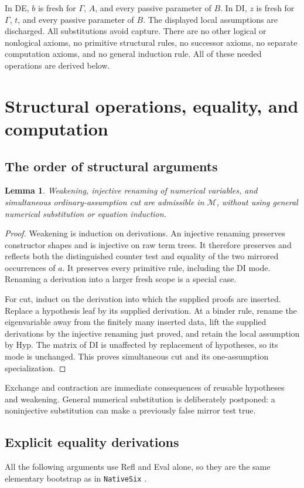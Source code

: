 \documentclass[11pt]{article}
\newtheorem{lemma}[theorem]{Lemma}
\theoremstyle{definition}\newtheorem{definition}[theorem]{Definition}
\newcommand{\Mcal}{\mathcal M}
\begin{document}
In DE, $b$ is fresh for $\Gamma$, $A$, and every passive parameter of
$B$. In DI, $z$ is fresh for $\Gamma$, $t$, and every passive parameter
of $B$. The displayed local assumptions are discharged. All substitutions
avoid capture. There are no other logical or nonlogical axioms, no
primitive structural rules, no successor axioms, no separate computation
axioms, and no general induction rule. All of these needed operations
are derived below.

\section{Structural operations, equality, and computation}

\subsection{The order of structural arguments}
\begin{lemma}\label{lem:struct}
Weakening, injective renaming of numerical variables, and simultaneous
ordinary-assumption cut are admissible in $\Mcal$, without using
general numerical substitution or equation induction.
\end{lemma}
\begin{proof}
Weakening is induction on derivations. An injective renaming preserves
constructor shapes and is injective on raw term trees. It therefore
preserves and reflects both the distinguished counter test and equality
of the two mirrored occurrences of $a$. It preserves every primitive
rule, including the DI mode. Renaming a derivation into a larger fresh
scope is a special case.

For cut, induct on the derivation into which the supplied proofs are
inserted. Replace a hypothesis leaf by its supplied derivation. At a
binder rule, rename the eigenvariable away from the finitely many
inserted data, lift the supplied derivations by the injective renaming
just proved, and retain the local assumption by Hyp. The matrix of DI
is unaffected by replacement of hypotheses, so its mode is unchanged.
This proves simultaneous cut and its one-assumption specialization.
\end{proof}

Exchange and contraction are immediate consequences of reusable
hypotheses and weakening. General numerical substitution is deliberately
postponed: a noninjective substitution can make a previously false
mirror test true.

\subsection{Explicit equality derivations}
All the following arguments use Refl and Eval alone, so they are the
same elementary bootstrap as in \texttt{NativeSix} \cite{six}.
\end{document}
